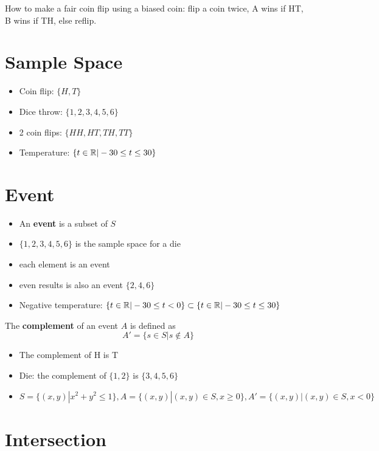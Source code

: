 \documentclass[12pt]{article}
\begin{document}
\begin{ex}
	How to make a fair coin flip using a biased coin: flip a coin twice, A wins if HT, B wins if TH, else reflip.
\end{ex}

\section{Sample Space}

\begin{itemize}
	\item Coin flip: $\{H, T\}$
	\item Dice throw: $\{1, 2, 3, 4, 5, 6\}$
	\item 2 coin flips: $\{HH, HT, TH, TT\}$
	\item Temperature: $\{t \in \mathbb{R} | -30 \leq t \leq 30\}$
\end{itemize}

\section{Event}

\begin{itemize}
	\item An \textbf{event} is a subset of $S$
	\item $\{1,2,3,4,5,6\}$ is the sample space for a die
	\item each element is an event
	\item even results is also an event $\{2,4,6\}$
	\item Negative temperature: $\{t\in\mathbb{R}|-30\leq t < 0\} \subset \{t\in\mathbb{R}|-30\leq t \leq 30\}$
\end{itemize}

\begin{defn}
	The \textbf{complement} of an event $A$ is defined as
	$$A' = \{s \in S|s \notin A\}$$
\end{defn}

\begin{itemize}
	\item The complement of H is T
	\item Die: the complement of $\{1,2\}$ is $\{3,4,5,6\}$
	\item $S = \{(x,y) | x^2 + y^2 \leq 1\}, A = \{(x,y) | (x,y) \in S, x \geq 0\}, A' = \{(x,y) | (x,y) \in S, x < 0\}$
\end{itemize}

\section{Intersection}
\end{document}

